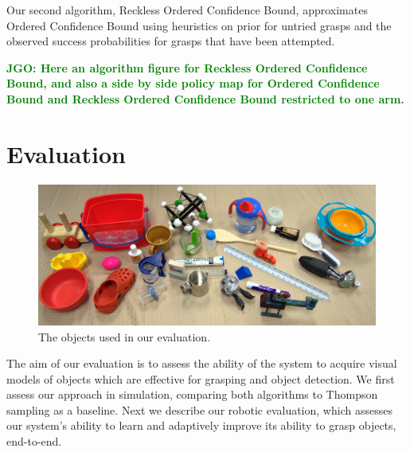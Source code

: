 \documentclass{article}
\newcommand{\jgonote}[1]{\textcolor{green}{\textbf{JGO: #1}}}
\newcommand{\algorithmCTxt}{Ordered Confidence Bound\xspace}
\newcommand{\algorithmDTxt}{Reckless Ordered Confidence Bound\xspace}
\begin{document}



Our second algorithm, \algorithmDTxt, approximates \algorithmCTxt using
heuristics on prior for untried grasps and the observed success probabilities
for grasps that have been attempted.

\jgonote{Here an algorithm figure for \algorithmDTxt, and also a side by side
policy map for \algorithmCTxt and \algorithmDTxt restricted to one arm.}

 
\section{Evaluation}
\label{sec:evaluation}

\begin{figure}
\includegraphics[width=1\linewidth]{figures/object_glory_shot.jpg}
\caption{The objects used in our evaluation.\label{fig:object_glory_shot}}
\end{figure}


The aim of our evaluation is to assess the ability of the system to
acquire visual models of objects which are effective for grasping and
object detection.  We first assess our approach in simulation,
comparing both algorithms to Thompson sampling as a baseline.  Next we
describe our robotic evaluation, which assesses our
system's ability to learn and adaptively improve its ability to grasp
objects, end-to-end.
\end{document}
